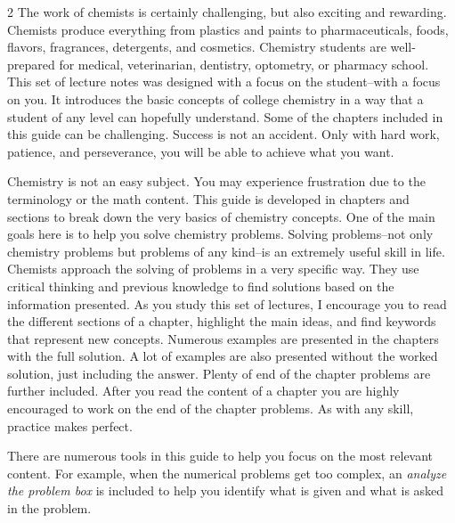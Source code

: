 \documentclass[main.tex]{subfiles}
\begin{document}
\pagestyle{style1}

\begin{fullwidth}
\begin{multicols*}{2}
The work of chemists is certainly challenging, but also exciting and rewarding. Chemists produce everything from plastics and paints to pharmaceuticals, foods, flavors, fragrances, detergents, and cosmetics. Chemistry students are well-prepared for medical, veterinarian, dentistry, optometry, or pharmacy school. This set of lecture notes was designed with a focus on the student--with a focus on you. It introduces the basic concepts of college chemistry in a way that a student of any level can hopefully understand. Some of the chapters included in this guide can be challenging. Success is not an accident. Only with hard work, patience, and perseverance, you will be able to achieve what you want. 

Chemistry is not an easy subject. You may experience frustration due to the terminology or the math content. This guide is developed in chapters and sections to break down the very basics of chemistry concepts. One of the main goals here is to help you solve chemistry problems. Solving problems--not only chemistry problems but problems of any kind--is an extremely useful skill in life. Chemists approach the solving of problems in a very specific way. They use critical thinking and previous knowledge to find solutions based on the information presented. As you study this set of lectures, I encourage you to read the different sections of a chapter, highlight the main ideas, and find keywords that represent new concepts. Numerous examples are presented in the chapters with the full solution. A lot of examples are also presented without the worked solution, just including the answer. Plenty of end of the chapter problems are further included. After you read the content of a chapter you are highly encouraged to work on the end of the chapter problems. As with any skill, practice makes perfect.

There are numerous tools in this guide to help you focus on the most relevant content. For example, when the numerical problems get too complex, an \emph{analyze the problem box} is included to help you identify what is given and what is asked in the problem.


\end{multicols*}
\end{fullwidth}
\end{document}
